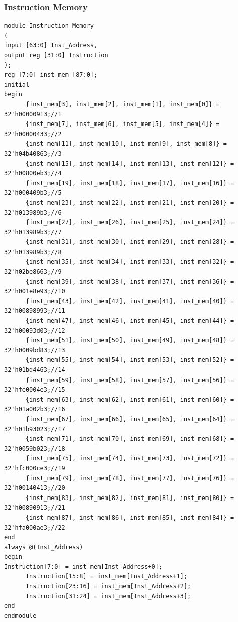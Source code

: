\documentclass{article}
\begin{document}
\subsubsection{Instruction Memory}
\begin{lstlisting}[caption={Design Module for Instruction Memory}, captionpos=b, language=RISC-V]
module Instruction_Memory
(
input [63:0] Inst_Address,
output reg [31:0] Instruction
);
reg [7:0] inst_mem [87:0];
initial
begin
      {inst_mem[3], inst_mem[2], inst_mem[1], inst_mem[0]} = 32'h00000913;//1
      {inst_mem[7], inst_mem[6], inst_mem[5], inst_mem[4]} = 32'h00000433;//2
      {inst_mem[11], inst_mem[10], inst_mem[9], inst_mem[8]} = 32'h04b40863;//3
      {inst_mem[15], inst_mem[14], inst_mem[13], inst_mem[12]} = 32'h00800eb3;//4
      {inst_mem[19], inst_mem[18], inst_mem[17], inst_mem[16]} = 32'h000409b3;//5	
      {inst_mem[23], inst_mem[22], inst_mem[21], inst_mem[20]} = 32'h013989b3;//6
      {inst_mem[27], inst_mem[26], inst_mem[25], inst_mem[24]} = 32'h013989b3;//7
      {inst_mem[31], inst_mem[30], inst_mem[29], inst_mem[28]} = 32'h013989b3;//8
      {inst_mem[35], inst_mem[34], inst_mem[33], inst_mem[32]} = 32'h02be8663;//9
      {inst_mem[39], inst_mem[38], inst_mem[37], inst_mem[36]} = 32'h001e8e93;//10	
      {inst_mem[43], inst_mem[42], inst_mem[41], inst_mem[40]} = 32'h00898993;//11
      {inst_mem[47], inst_mem[46], inst_mem[45], inst_mem[44]} = 32'h00093d03;//12
      {inst_mem[51], inst_mem[50], inst_mem[49], inst_mem[48]} = 32'h0009bd83;//13
      {inst_mem[55], inst_mem[54], inst_mem[53], inst_mem[52]} = 32'h01bd4463;//14
      {inst_mem[59], inst_mem[58], inst_mem[57], inst_mem[56]} = 32'hfe0004e3;//15
      {inst_mem[63], inst_mem[62], inst_mem[61], inst_mem[60]} = 32'h01a002b3;//16
      {inst_mem[67], inst_mem[66], inst_mem[65], inst_mem[64]} = 32'h01b93023;//17
      {inst_mem[71], inst_mem[70], inst_mem[69], inst_mem[68]} = 32'h0059b023;//18
      {inst_mem[75], inst_mem[74], inst_mem[73], inst_mem[72]} = 32'hfc000ce3;//19
      {inst_mem[79], inst_mem[78], inst_mem[77], inst_mem[76]} = 32'h00140413;//20
      {inst_mem[83], inst_mem[82], inst_mem[81], inst_mem[80]} = 32'h00890913;//21
      {inst_mem[87], inst_mem[86], inst_mem[85], inst_mem[84]} = 32'hfa000ae3;//22
end
always @(Inst_Address)
begin
Instruction[7:0] = inst_mem[Inst_Address+0];
      Instruction[15:8] = inst_mem[Inst_Address+1];
      Instruction[23:16] = inst_mem[Inst_Address+2];
      Instruction[31:24] = inst_mem[Inst_Address+3];
end
endmodule
\end{lstlisting}
\end{document}
